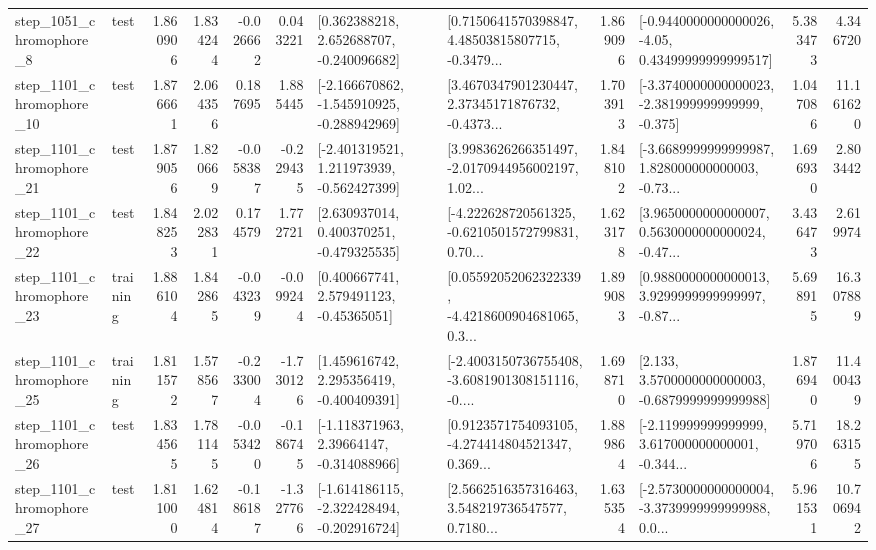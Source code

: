 \begin{tabular}{llrrrrllrlrr}
  step\_1051\_chromophore\_8 &      test &      1.860906 &    1.834244 &     -0.026662 &  0.043221 &    [0.362388218, 2.652688707, -0.240096682] &  [0.7150641570398847, 4.48503815807715, -0.3479... &       1.869096 &  [-0.9440000000000026, -4.05, 0.43499999999999517] &            5.383473 &          4.346720 \\
 step\_1101\_chromophore\_10 &      test &      1.876661 &    2.064356 &      0.187695 &  1.885445 &  [-2.166670862, -1.545910925, -0.288942969] &  [3.4670347901230447, 2.37345171876732, -0.4373... &       1.703913 &  [-3.3740000000000023, -2.381999999999999, -0.375] &            1.047086 &         11.161620 \\
 step\_1101\_chromophore\_21 &      test &      1.879056 &    1.820669 &     -0.058387 & -0.229435 &   [-2.401319521, 1.211973939, -0.562427399] &  [3.9983626266351497, -2.0170944956002197, 1.02... &       1.848102 &  [-3.6689999999999987, 1.828000000000003, -0.73... &            1.696930 &          2.803442 \\
 step\_1101\_chromophore\_22 &      test &      1.848253 &    2.022831 &      0.174579 &  1.772721 &    [2.630937014, 0.400370251, -0.479325535] &  [-4.222628720561325, -0.6210501572799831, 0.70... &       1.623178 &  [3.9650000000000007, 0.5630000000000024, -0.47... &            3.436473 &          2.619974 \\
 step\_1101\_chromophore\_23 &  training &      1.886104 &    1.842865 &     -0.043239 & -0.099244 &     [0.400667741, 2.579491123, -0.45365051] &  [0.05592052062322339, -4.4218600904681065, 0.3... &       1.899083 &  [0.9880000000000013, 3.9299999999999997, -0.87... &            5.698915 &         16.307889 \\
 step\_1101\_chromophore\_25 &  training &      1.811572 &    1.578567 &     -0.233004 & -1.730126 &    [1.459616742, 2.295356419, -0.400409391] &  [-2.4003150736755408, -3.6081901308151116, -0.... &       1.698710 &   [2.133, 3.5700000000000003, -0.6879999999999988] &            1.876940 &         11.400439 \\
 step\_1101\_chromophore\_26 &      test &      1.834565 &    1.781145 &     -0.053420 & -0.186745 &    [-1.118371963, 2.39664147, -0.314088966] &  [0.9123571754093105, -4.274414804521347, 0.369... &       1.889864 &  [-2.119999999999999, 3.617000000000001, -0.344... &            5.719706 &         18.263155 \\
 step\_1101\_chromophore\_27 &      test &      1.811000 &    1.624814 &     -0.186187 & -1.327766 &  [-1.614186115, -2.322428494, -0.202916724] &  [2.5662516357316463, 3.548219736547577, 0.7180... &       1.635354 &  [-2.5730000000000004, -3.3739999999999988, 0.0... &            5.961531 &         10.706942 \\

\end{tabular}
